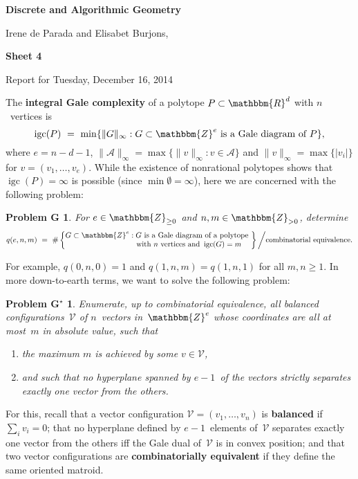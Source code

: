 \documentclass[11pt]{amsart}
\newcommand{\R}{\mathbbm{R}}
\newcommand{\Z}{\mathbbm{Z}}
\newcommand{\VV}{\mathcal{V}}
\DeclareMathOperator{\igc}{igc}
\newcommand{\defn}[1]{\textbf{\color{blue}#1}} %
\newtheorem*{problemG}{Problem G}
\newtheorem*{problemG*}{Problem G$^\star$}
\begin{document}
\begin{center}
\textbf{\sffamily
Discrete and Algorithmic Geometry }
\medskip

Irene de Parada and Elisabet Burjons,
\end{center}
\bigskip
\begin{center}
\textbf{\sffamily Sheet 4}
\bigskip

Report for Tuesday, December 16, 2014
\end{center}
\bigskip
\bigskip
The \defn{integral Gale complexity} of a polytope $P\subset\R^d$ with $n$~vertices is
\[
\igc(P)
\ = \
\min\{\|G\|_\infty : G \subset\Z^e \text{ is a Gale diagram of } P\},
\]
where $e=n-d-1$, $\|\mathcal A\|_\infty = \max\{\|v\|_\infty : v\in\mathcal A\}$ and $\|v\|_\infty = \max\{|v_i|\}$ for $v=(v_1,\dots,v_e)$.
While the existence of nonrational polytopes shows that $\igc(P)=\infty$ is possible (since $\min\emptyset=\infty$), here we are concerned with the following problem:
\begin{problemG}
For $e\in\Z_{\ge0}$ and $n, m\in\Z_{>0}$, determine
\[
q(e,n,m)
\ = \
\#\left\{
\begin{matrix}
G\subset\Z^e : G \text{ is a Gale diagram of a polytope } \\
\phantom{G\subset\Z^e}\!\!\text{with $n$ vertices and } \igc(G)=m
\end{matrix}
\right\} \bigg/ \text{combinatorial equivalence}.
\]
\end{problemG}
\noindent For example, $q(0,n,0) = 1$ and $q(1,n,m)=q(1,n,1)$ for all $m,n\ge1$. In more down-to-earth terms, we want to solve the following problem:
\begin{problemG*}
Enumerate, up to combinatorial equivalence, all balanced configurations~$\VV$ of $n$~vectors in~$\Z^e$ whose coordinates are all at most~$m$ in absolute value, such that
\begin{enumerate}
\item the maximum $m$ is achieved by some $v\in\VV$,
\item and such that no hyperplane spanned by $e-1$~of the vectors strictly separates exactly one vector from the others.
\end{enumerate}
\end{problemG*}
For this, recall
that a vector configuration $\VV = (v_1,\dots,v_n)$ is \defn{balanced} if $\sum_i v_i=0$;
that no hyperplane defined by $e-1$~elements of~$\VV$ separates exactly one vector from the others iff the Gale dual of~$\VV$ is in convex position;
and that two vector configurations are \defn{combinatorially equivalent} if they define the same oriented matroid.
\end{document}
